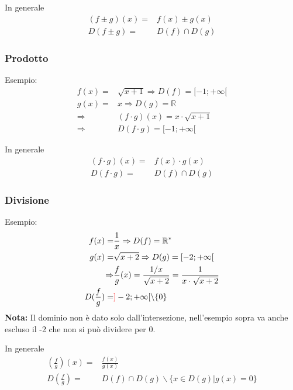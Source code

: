 \documentclass[../main.tex]{subfiles}
\begin{document}
In generale
\begin{align*}
    (f\pm g)(x) =& f(x)\pm g(x)\\
    D(f\pm g) =& D(f) \cap D(g) 
\end{align*}

\subsubsection{Prodotto}
Esempio:
\begin{align*}
    f(x) =& \sqrt{x + 1} \Rightarrow D(f) = [-1; +\infty[ \\
    g(x) =& x \Rightarrow D(g) = \mathbb{R} \\
    \Rightarrow& (f \cdot g)(x) = x \cdot \sqrt{x + 1} \\
    \Rightarrow& D(f \cdot g) = [-1;+\infty[
\end{align*}

In generale
\begin{align*}
    (f \cdot g)(x) =& f(x) \cdot g(x) \\
    D(f \cdot g) =& D(f) \cap D(g)  
\end{align*}

\subsubsection{Divisione}
Esempio:
\begin{align*}
    f(x) =& \frac{1}{x} \Rightarrow D(f) = \mathbb{R}^* \\
    g(x) =& \sqrt{x + 2} \Rightarrow D(g) = [-2;+\infty[ \\
    \Rightarrow& \frac{f}{g}(x) = \frac{1/x}{\sqrt{x + 2}} = \frac{1}{x \cdot \sqrt{x + 2}} \\
    D(\frac{f}{g}) =& \color{red}]\color{black}-2;+\infty[\backslash \{0\}
\end{align*}
\textbf{Nota:} Il dominio non è dato solo dall'intersezione, nell'esempio sopra va anche \color{red}escluso \color{black} il -2 che non si può dividere per 0.

In generale
\begin{align*}
    (\frac{f}{g})(x) =& \frac{f(x)}{g(x)} \\
    D(\frac{f}{g}) =& D(f) \cap D(g) \backslash \{x \in D(g) | g(x) = 0\}
\end{align*}
\end{document}
